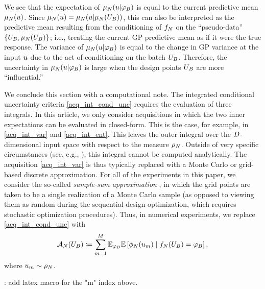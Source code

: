\documentclass[12pt]{article}
\begin{document}
We see that the expectation of $\gpMean[\Ndesign](\Par| \designBatchFunc)$ 
is equal to the current predictive mean $\gpMean[\Ndesign](\Par)$. Since 
$\gpMean[\Ndesign](\Par) = \gpMean[\Ndesign](\Par | \gpMean[\Ndesign](\designBatchIn))$, this can also be 
interpreted as the predictive mean resulting from the conditioning of $\funcEm[\Ndesign]$ on the ``pseudo-data''
$\{\designBatchIn, \gpMean[\Ndesign](\designBatchIn)\}$; i.e., treating the current GP predictive mean as if it were 
the true response. The variance of 
$\gpMean[\Ndesign](\Par | \designBatchFunc)$ is equal to the change in GP variance at the input $\Par$ due to the act 
of conditioning on the batch $\designBatchIn$. Therefore, the uncertainty in $\gpMean[\Ndesign](\Par | \designBatchFunc)$ 
is large when the design points $\designBatchIn$ are more ``influential.''

We conclude this section with a computational note. The integrated conditional uncertainty criteria 
\ref{acq_int_cond_unc} requires the evaluation of three integrals. In this article, we only consider acquisitions in which 
the two inner expectations can be evaluated in closed-form. This is the case, for example, in \ref{acq_int_var} and 
\ref{acq_int_ent}. This leaves the outer integral over the $\dimPar$-dimensional input space with respect to the 
measure $\weightDens$. Outside of very specific circumstances (see, e.g., \cite{Binois_2018}), this integral 
cannot be computed analytically. The acquisition \ref{acq_int_var} is thus typically replaced with a Monte Carlo or 
grid-based discrete approximation. For all of the experiments in this paper, we consider the so-called 
\textit{sample-sum approximation} \citep{Mercer_kernels_IVAR}, in which the grid points are taken to be a 
single realization of a Monte Carlo sample (as opposed to viewing them as random during the sequential 
design optimization, which requires stochastic optimization procedures). Thus, in numerical experiments, we replace
\ref{acq_int_cond_unc} with 
\begin{equation}
\acq[\Ndesign](\designIn[\Nbatch])
\Def \sum_{m=1}^{M} \E_{\funcVal[\Nbatch]} \E \left[\qoi(\Par_m) \given 
\funcEm[\Ndesign](\designBatchIn) = \designBatchFunc \right], \label{acq_int_cond_unc_grid}
\end{equation}
where $\Par_m \sim \weightDens$.

\todo: add latex macro for the "m" index above.
\end{document}
